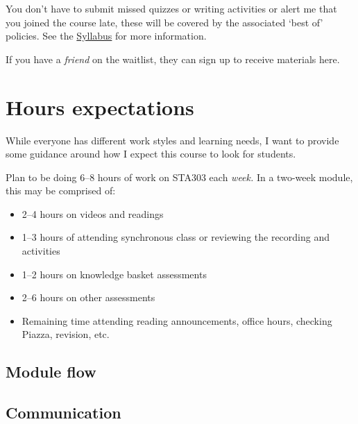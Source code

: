 \documentclass[
  openany]{book}
\begin{document}
You don't have to submit missed quizzes or writing activities or alert me that you joined the course late, these will be covered by the associated `best of' policies. See the \protect\hyperlink{syllabus}{Syllabus} for more information.

If you have a \emph{friend} on the waitlist, they can sign up to receive materials here.

\hypertarget{hours-expectations-1}{%
\section{Hours expectations}\label{hours-expectations-1}}

While everyone has different work styles and learning needs, I want to provide some guidance around how I expect this course to look for students.

Plan to be doing 6--8 hours of work on STA303 each \emph{week.} In a two-week module, this may be comprised of:

\begin{itemize}
\item
  2--4 hours on videos and readings
\item
  1--3 hours of attending synchronous class or reviewing the recording and activities
\item
  1--2 hours on knowledge basket assessments
\item
  2--6 hours on other assessments
\item
  Remaining time attending reading announcements, office hours, checking Piazza, revision, etc.
\end{itemize}

\hypertarget{module-flow}{%
\subsection{Module flow}\label{module-flow}}

\hypertarget{communication}{%
\subsection{Communication}\label{communication}}
\end{document}
